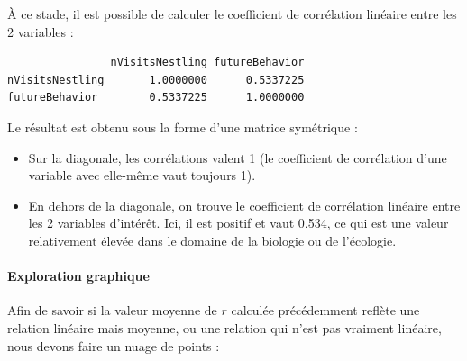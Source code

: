 \documentclass[
  a4paper,
]{article}
\newenvironment{Shaded}{\begin{snugshade}}{\end{snugshade}}
\newcommand{\DataTypeTok}[1]{\textcolor[rgb]{0.00,0.34,0.68}{#1}}
\newcommand{\KeywordTok}[1]{\textcolor[rgb]{0.12,0.11,0.11}{\textbf{#1}}}
\newcommand{\NormalTok}[1]{\textcolor[rgb]{0.12,0.11,0.11}{#1}}
\newcommand{\OperatorTok}[1]{\textcolor[rgb]{0.12,0.11,0.11}{#1}}
\newcommand{\StringTok}[1]{\textcolor[rgb]{0.75,0.01,0.01}{#1}}
\providecommand{\tightlist}{%
  \setlength{\itemsep}{0pt}\setlength{\parskip}{0pt}}
\begin{document}
À ce stade, il est possible de calculer le coefficient de corrélation linéaire entre les 2 variables :

\begin{Shaded}
\end{Shaded}

\begin{verbatim}
                nVisitsNestling futureBehavior
nVisitsNestling       1.0000000      0.5337225
futureBehavior        0.5337225      1.0000000
\end{verbatim}

Le résultat est obtenu sous la forme d'une matrice symétrique :

\begin{itemize}
\tightlist
\item
  Sur la diagonale, les corrélations valent 1 (le coefficient de corrélation d'une variable avec elle-même vaut toujours 1).
\item
  En dehors de la diagonale, on trouve le coefficient de corrélation linéaire entre les 2 variables d'intérêt. Ici, il est positif et vaut 0.534, ce qui est une valeur relativement élevée dans le domaine de la biologie ou de l'écologie.
\end{itemize}

\hypertarget{exploration-graphique-4}{%
\paragraph{Exploration graphique}\label{exploration-graphique-4}}

Afin de savoir si la valeur moyenne de \(r\) calculée précédemment reflète une relation linéaire mais moyenne, ou une relation qui n'est pas vraiment linéaire, nous devons faire un nuage de points :

\begin{Shaded}
\end{Shaded}
\end{document}
